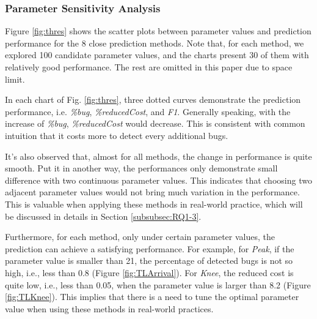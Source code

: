 \documentclass[sigconf,review, anonymous]{acmart}
\begin{document}
\subsubsection{\textbf{Parameter Sensitivity Analysis}}
\label{subsubsec:RQ1-1}

Figure \ref{fig:thres} shows the scatter plots between parameter values and prediction performance for the 8 close prediction methods.
Note that, for each method, we explored 100 candidate parameter values, and the charts present 30 of them with relatively good performance. The rest are omitted in this paper due to space limit.

In each chart of Fig. \ref{fig:thres}, three dotted curves demonstrate the prediction performance, i.e. \textit{\%bug}, \textit{\%reducedCost}, and \textit{F1}.
Generally speaking, with the increase of  \textit{\%bug},  \textit{\%reducedCost} would decrease.
This is consistent with common intuition that it costs more to detect every additional bugs.

It's also observed that, almost for all methods, the change in performance is quite smooth.
Put it in another way, the performances only demonstrate small difference with two continuous parameter values.
This indicates that choosing two adjacent parameter values would not bring much variation in the performance.
This is valuable when applying these methods in real-world practice, which will be discussed in details in Section \ref{subsubsec:RQ1-3}.


Furthermore, for each method, only under certain parameter values, the prediction can achieve a satisfying performance.
For example, for \textit{Peak}, if the parameter value is smaller than 21, the percentage of detected bugs is not so high, i.e., less than 0.8 (Figure \ref{fig:TLArrival}).
For \textit{Knee}, the reduced cost is quite low, i.e., less than 0.05, when the parameter value is larger than 8.2 (Figure \ref{fig:TLKnee}).
This implies that there is a need to tune the optimal parameter value when using these methods in real-world practices.
\end{document}
